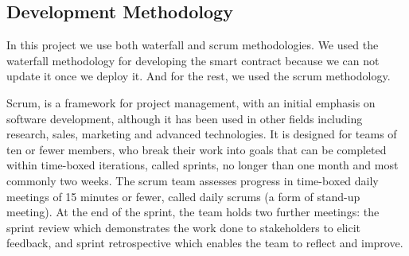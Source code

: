 
\subsection{Development Methodology}

In this project we use both waterfall and scrum methodologies.
We used the waterfall methodology for developing the smart contract because we can not update it once we deploy it. And for the rest, we used the scrum methodology.

Scrum, is a framework for project management, with an initial emphasis on software development, although it has been used in other fields including research, sales, marketing and advanced technologies. It is designed for teams of ten or fewer members, who break their work into goals that can be completed within time-boxed iterations, called sprints, no longer than one month and most commonly two weeks. The scrum team assesses progress in time-boxed daily meetings of 15 minutes or fewer, called daily scrums (a form of stand-up meeting). At the end of the sprint, the team holds two further meetings: the sprint review which demonstrates the work done to stakeholders to elicit feedback, and sprint retrospective which enables the team to reflect and improve.

